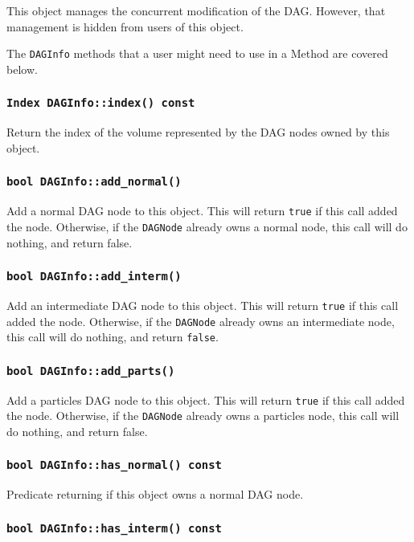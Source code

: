 This object manages the concurrent modification of the DAG. However, that
management is hidden from users of this object.

The \texttt{DAGInfo} methods that a user might need to use in a Method are
covered below.

\subsubsection{\texttt{Index DAGInfo::index() const}}

Return the index of the volume represented by the DAG nodes owned by this
object.

\subsubsection{\texttt{bool DAGInfo::add\_normal()}}

Add a normal DAG node to this object. This will return \texttt{true} if this
call added the node. Otherwise, if the \texttt{DAGNode} already owns a normal
node, this call will do nothing, and return false.

\subsubsection{\texttt{bool DAGInfo::add\_interm()}}

Add an intermediate DAG node to this object. This will return \texttt{true} if
this call added the node. Otherwise, if the \texttt{DAGNode} already owns an
intermediate node, this call will do nothing, and return \texttt{false}.

\subsubsection{\texttt{bool DAGInfo::add\_parts()}}

Add a particles DAG node to this object. This will return \texttt{true} if this
call added the node. Otherwise, if the \texttt{DAGNode} already owns a particles
node, this call will do nothing, and return false.

\subsubsection{\texttt{bool DAGInfo::has\_normal() const}}

Predicate returning if this object owns a normal DAG node.

\subsubsection{\texttt{bool DAGInfo::has\_interm() const}}

